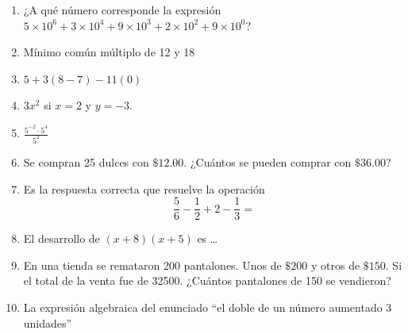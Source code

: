 \documentclass{article}
\begin{document}
\begin{enumerate}
    \item ¿A qué número corresponde la expresión \(5\times 10^6 + 3\times 10^4 + 9\times 10^3 + 2\times 10^2 + 9\times 10^0\)?
    \item Mínimo común múltiplo de 12 y 18
    \item \(5 + 3(8 - 7) - 11(0)\)
    \item \(3x^2\) si \(x = 2\) y \(y = -3\).
    \item \(\frac{5^{-2}\cdot5^4}{5^2}\)
    \item Se compran 25 dulces con \(\mathdollar 12.00\). ¿Cuántos se pueden comprar con \(\mathdollar 36.00\)?
    \item Es la respuesta correcta que resuelve la operación \[\frac{5}{6} - \frac{1}{2} + 2 - \frac{1}{3} = \]
    \item El desarrollo de \((x + 8)(x + 5)\) es \dots
    \item En una tienda se remataron 200 pantalones. Unos de \(\mathdollar 200\) y otros de \(\mathdollar 150\). Si el total de la venta fue de 32500. ¿Cuántos pantalones de 150 se vendieron?
    \item La expresión algebraica del enunciado ``el doble de un número aumentado 3 unidades''
\end{enumerate}
\end{document}

